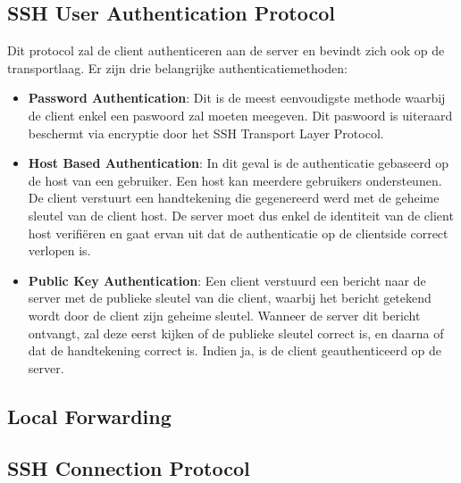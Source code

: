 \documentclass{report}
\begin{document}
	\subsection{SSH User Authentication Protocol}
	Dit protocol zal de client authenticeren aan de server en bevindt zich ook op de transportlaag. Er zijn drie belangrijke authenticatiemethoden:
	\begin{itemize}
		\item \textbf{Password Authentication}: Dit is de meest eenvoudigste methode waarbij de client enkel een paswoord zal moeten meegeven. Dit paswoord is uiteraard beschermt via encryptie door het SSH Transport Layer Protocol.
		\item \textbf{Host Based Authentication}: In dit geval is de authenticatie gebaseerd op de host van een gebruiker. Een host kan meerdere gebruikers ondersteunen. De client verstuurt een handtekening die gegenereerd werd met de geheime sleutel van de client host. De server moet dus enkel de identiteit van de client host verifiëren en gaat ervan uit dat de authenticatie op de clientside correct verlopen is.
		
		\item \textbf{Public Key Authentication}: Een client verstuurd een bericht naar de server met de publieke sleutel van die client, waarbij het bericht getekend wordt door de client zijn geheime sleutel. Wanneer de server dit bericht ontvangt, zal deze eerst kijken of de publieke sleutel correct is, en daarna of dat de handtekening correct is. Indien ja, is de client geauthenticeerd op de server.
	\end{itemize}
	\subsection{Local Forwarding}


	\subsection{SSH Connection Protocol}
	
\end{document}
